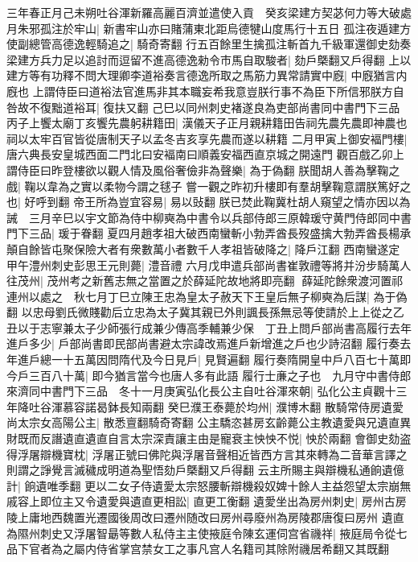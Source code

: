 三年春正月己未朔吐谷渾新羅高麗百濟並遣使入貢　癸亥梁建方契苾何力等大破處月朱邪孤注於牢山|{
	新書牢山亦曰賭蒲東北距烏德犍山度馬行十五日}
孤注夜遁建方使副總管高德逸輕騎追之|{
	騎奇寄翻}
行五百餘里生擒孤注斬首九千級軍還御史劾奏梁建方兵力足以追討而逗留不進高德逸勑令市馬自取駿者|{
	劾戶槩翻又戶得翻}
上以建方等有功釋不問大理卿李道裕奏言德逸所取之馬筋力異常請實中廐|{
	中廐猶言内廐也}
上謂侍臣曰道裕法官進馬非其本職妄希我意豈朕行事不為臣下所信邪朕方自咎故不復黜道裕耳|{
	復扶又翻}
己巳以同州刺史褚遂良為吏部尚書同中書門下三品　丙子上饗太廟丁亥饗先農躬耕籍田|{
	漢儀天子正月親耕籍田告祠先農先農即神農也祠以太牢百官皆從唐制天子以孟冬吉亥享先農而遂以耕籍}
二月甲寅上御安褔門樓|{
	唐六典長安皇城西面二門北曰安褔南曰順義安福西直京城之開遠門}
觀百戲乙卯上謂侍臣曰昨登樓欲以觀人情及風俗奢儉非為聲樂|{
	為于偽翻}
朕聞胡人善為擊鞠之戲|{
	鞠以韋為之實以柔物今謂之毬子}
嘗一觀之昨初升樓即有羣胡擊鞠意謂朕篤好之也|{
	好呼到翻}
帝王所為豈宜容易|{
	易以䜴翻}
朕已焚此鞠冀杜胡人窺望之情亦因以為誡　三月辛巳以宇文節為侍中柳奭為中書令以兵部侍郎三原韓瑗守黄門侍郎同中書門下三品|{
	瑗于眷翻}
夏四月趙孝祖大破西南蠻斬小勃弄酋長歿盛擒大勃弄酋長楊承顛自餘皆屯聚保險大者有衆數萬小者數千人孝祖皆破降之|{
	降戶江翻}
西南蠻遂定　甲午澧州刺史彭思王元則薨|{
	澧音禮}
六月戊申遣兵部尚書崔敦禮等將并汾步騎萬人往茂州|{
	茂州考之新舊志無之當置之於薛延陀故地將即亮翻}
薛延陀餘衆渡河置祁連州以處之　秋七月丁巳立陳王忠為皇太子赦天下王皇后無子柳奭為后謀|{
	為于偽翻}
以忠母劉氏微賤勸后立忠為太子冀其親已外則諷長孫無忌等使請於上上從之乙丑以于志寧兼太子少師張行成兼少傳高季輔兼少保　丁丑上問戶部尚書高履行去年進戶多少|{
	戶部尚書即民部尚書避太宗諱改焉進戶新增進之戶也少詩沼翻}
履行奏去年進戶總一十五萬因問隋代及今日見戶|{
	見賢遍翻}
履行奏隋開皇中戶八百七十萬即今戶三百八十萬|{
	即今猶言當今也唐人多有此語}
履行士亷之子也　九月守中書侍郎來濟同中書門下三品　冬十一月庚寅弘化長公主自吐谷渾來朝|{
	弘化公主貞觀十三年降吐谷渾慕容諾曷鉢長知兩翻}
癸巳濮王泰薨於均州|{
	濮博木翻}
散騎常侍房遺愛尚太宗女高陽公主|{
	散悉亶翻騎奇寄翻}
公主驕恣甚房玄齡薨公主教遺愛與兄遺直異財既而反譖遺直遺直自言太宗深責讓主由是寵衰主怏怏不悦|{
	怏於兩翻}
會御史劾盗得浮屠辯機寶枕|{
	浮屠正號曰佛陀與浮屠音聲相近皆西方言其來轉為二音華言譯之則謂之諍覺言滅穢成明道為聖悟劾戶槩翻又戶得翻}
云主所賜主與辯機私通餉遺億計|{
	餉遺唯季翻}
更以二女子侍遺愛太宗怒腰斬辯機殺奴婢十餘人主益怨望太宗崩無戚容上即位主又令遺愛與遺直更相訟|{
	直更工衡翻}
遺愛坐出為房州刺史|{
	房州古房陵上庸地西魏置光遷國後周改曰遷州随改曰房州尋廢州為房陵郡唐復曰房州}
遺直為隰州刺史又浮屠智朂等數人私侍主主使掖庭令陳玄運伺宫省禨祥|{
	掖庭局令從七品下官者為之屬内侍省掌宫禁女工之事凡宫人名籍司其除附禨居希翻又其既翻}
